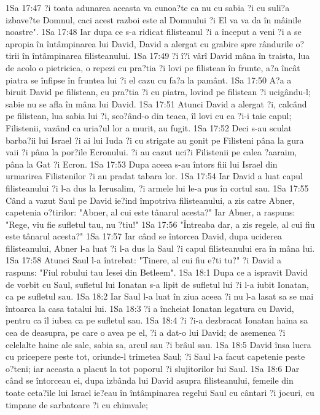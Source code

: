 1Sa 17:47  ?i toata adunarea aceasta va cunoa?te ca nu cu sabia ?i cu suli?a izbave?te Domnul, caci acest razboi este al Domnului ?i El va va da în mâinile noastre".
1Sa 17:48  Iar dupa ce s-a ridicat filisteanul ?i a început a veni ?i a se apropia în întâmpinarea lui David, David a alergat cu grabire spre rândurile o?tirii în întâmpinarea filisteanului.
1Sa 17:49  ?i î?i vârî David mâna în traista, lua de acolo o pietricica, o repezi cu pra?tia ?i lovi pe filistean în frunte, a?a încât piatra se înfipse în fruntea lui ?i el cazu cu fa?a la pamânt.
1Sa 17:50  A?a a biruit David pe filistean, cu pra?tia ?i cu piatra, lovind pe filistean ?i ucigându-l; sabie nu se afla în mâna lui David.
1Sa 17:51  Atunci David a alergat ?i, calcând pe filistean, lua sabia lui ?i, sco?ând-o din teaca, îl lovi cu ea ?i-i taie capul; Filistenii, vazând ca uria?ul lor a murit, au fugit.
1Sa 17:52  Deci s-au sculat barba?ii lui Israel ?i ai lui Iuda ?i cu strigate au gonit pe Filisteni pâna la gura vaii ?i pâna la por?ile Ecronului. ?i au cazut uci?i Filistenii pe calea ?aaraim, pâna la Gat ?i Ecron.
1Sa 17:53  Dupa aceea s-au întors fiii lui Israel din urmarirea Filistenilor ?i au pradat tabara lor.
1Sa 17:54  Iar David a luat capul filisteanului ?i l-a dus la Ierusalim, ?i armele lui le-a pus în cortul sau.
1Sa 17:55  Când a vazut Saul pe David ie?ind împotriva filisteanului, a zis catre Abner, capetenia o?tirilor: "Abner, al cui este tânarul acesta?" Iar Abner, a raspuns: "Rege, viu fie sufletul tau, nu ?tiu!"
1Sa 17:56  "Întreaba dar, a zis regele, al cui fiu este tânarul acesta?"
1Sa 17:57  Iar când se întorcea David, dupa uciderea filisteanului, Abner l-a luat ?i l-a dus la Saul ?i capul filisteanului era în mâna lui.
1Sa 17:58  Atunci Saul l-a întrebat: "Tinere, al cui fiu e?ti tu?" ?i David a raspuns: "Fiul robului tau Iesei din Betleem".
1Sa 18:1  Dupa ce a ispravit David de vorbit cu Saul, sufletul lui Ionatan s-a lipit de sufletul lui ?i l-a iubit Ionatan, ca pe sufletul sau.
1Sa 18:2  Iar Saul l-a luat în ziua aceea ?i nu l-a lasat sa se mai întoarca la casa tatalui lui.
1Sa 18:3  ?i a încheiat Ionatan legatura cu David, pentru ca îl iubea ca pe sufletul sau.
1Sa 18:4  ?i ?i-a dezbracat Ionatan haina sa cea de deasupra, pe care o avea pe el, ?i a dat-o lui David; de asemenea ?i celelalte haine ale sale, sabia sa, arcul sau ?i brâul sau.
1Sa 18:5  David însa lucra cu pricepere peste tot, oriunde-l trimetea Saul; ?i Saul l-a facut capetenie peste o?teni; iar aceasta a placut la tot poporul ?i slujitorilor lui Saul.
1Sa 18:6  Dar când se întorceau ei, dupa izbânda lui David asupra filisteanului, femeile din toate ceta?ile lui Israel ie?eau în întâmpinarea regelui Saul cu cântari ?i jocuri, cu timpane de sarbatoare ?i cu chimvale;

